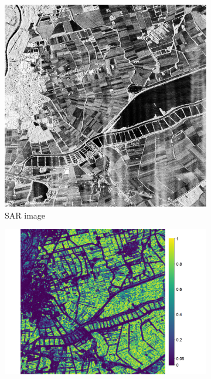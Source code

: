 \documentclass[
  journal,
]{IEEEtran}%
\begin{document}
\begin{figure}[hbt]
    \centering
    \begin{subfigure}{0.17\textwidth}
        \includegraphics[width=\linewidth]{./Figures/munich_1024_2.png}
        \caption{SAR image}
        \label{fig:2a}
    \end{subfigure}
    \begin{subfigure}{0.23\textwidth}
        \includegraphics[width=\linewidth]{./Figures/H_pvalue_muni_renyi.png}

\end{subfigure}
\end{figure}
\end{document}
